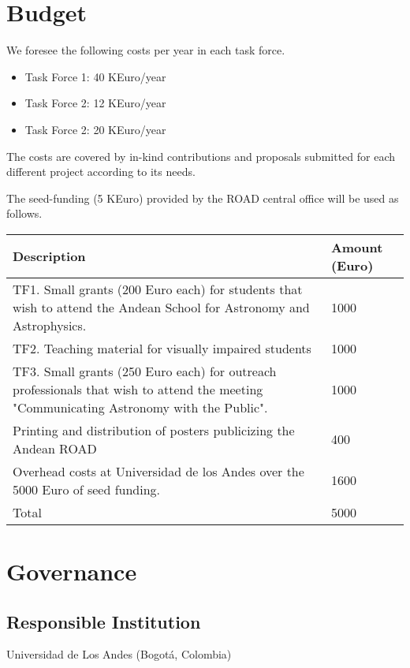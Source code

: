 \documentclass[12pt]{article}
\begin{document}
\section{Budget}

We foresee the following costs per year in each task force. 
\begin{itemize}
\item Task Force 1: 40 KEuro/year
\item Task Force 2: 12 KEuro/year
\item Task Force 2: 20 KEuro/year
\end{itemize}

The costs are covered by in-kind contributions and proposals
submitted for each different project according to its needs.

The seed-funding (5 KEuro) provided by the ROAD central office will be used as follows.

\begin{center}
\begin{tabular}{|p{11cm} |p{1.5cm}|}\hline\hline
Description &Amount (Euro) \\\hline
TF1. Small grants (200 Euro each) for students that wish to attend the
Andean School for Astronomy and Astrophysics. & 1000\\\hline 
TF2.  Teaching material for visually impaired students & 1000\\\hline
TF3. Small grants (250 Euro each) for outreach professionals that
wish to attend the meeting "Communicating Astronomy with the Public".&
1000\\\hline  
Printing and distribution of posters publicizing the Andean ROAD
&400 \\\hline 
Overhead costs at Universidad de los Andes over the 5000 Euro of seed
funding. & 1600\\\hline 
Total &5000\\\hline\hline
\end{tabular}
\end{center}


\section{Governance}

\subsection*{Responsible Institution}
\noindent
Universidad de Los Andes (Bogotá, Colombia)
\end{document}
